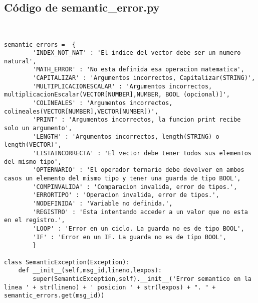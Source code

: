 \subsection{Código de semantic\_error.py}

\begin{verbatim}


semantic_errors =  {
        'INDEX_NOT_NAT' : 'El indice del vector debe ser un numero natural',
        'MATH_ERROR' : 'No esta definida esa operacion matematica',
        'CAPITALIZAR' : 'Argumentos incorrectos, Capitalizar(STRING)',
        'MULTIPLICACIONESCALAR' : 'Argumentos incorrectos, multiplicacionEscalar(VECTOR[NUMBER],NUMBER, BOOL (opcional)]',
        'COLINEALES' : 'Argumentos incorrectos, colineales(VECTOR[NUMBER],VECTOR[NUMBER])',
        'PRINT' : 'Argumentos incorrectos, la funcion print recibe solo un argumento',
        'LENGTH' : 'Argumentos incorrectos, length(STRING) o length(VECTOR)',
        'LISTAINCORRECTA' : 'El vector debe tener todos sus elementos del mismo tipo',
        'OPTERNARIO' : 'El operador ternario debe devolver en ambos casos un elemento del mismo tipo y tener una guarda de tipo BOOL',
        'COMPINVALIDA' : 'Comparacion invalida, error de tipos.',
        'ERRORTIPO' : 'Operacion invalida, error de tipos.',
        'NODEFINIDA' : 'Variable no definida.',
        'REGISTRO' : 'Esta intentando acceder a un valor que no esta en el registro.',
        'LOOP' : 'Error en un ciclo. La guarda no es de tipo BOOL',
        'IF' : 'Error en un IF. La guarda no es de tipo BOOL',
        }

class SemanticException(Exception):
    def __init__(self,msg_id,lineno,lexpos):
        super(SemanticException,self).__init__('Error semantico en la linea ' + str(lineno) + ' posicion ' + str(lexpos) + ". " + semantic_errors.get(msg_id))

\end{verbatim}
\endgroup
